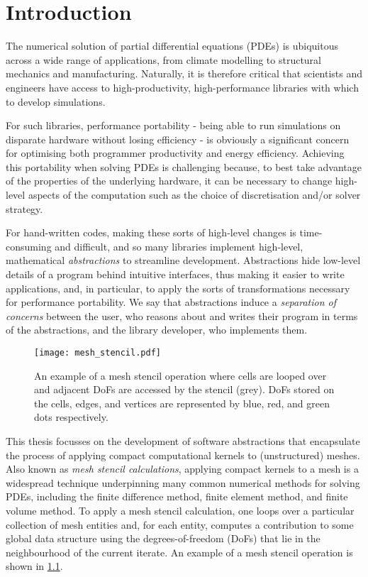 \documentclass[thesis]{subfiles}
\begin{document}
\chapter{Introduction}
\label{chapter:introduction}

The numerical solution of partial differential equations (PDEs) is ubiquitous across a wide range of applications, from climate modelling to structural mechanics and manufacturing.
Naturally, it is therefore critical that scientists and engineers have access to high-productivity, high-performance libraries with which to develop simulations.

For such libraries, performance portability - being able to run simulations on disparate hardware without losing efficiency - is obviously a significant concern for optimising both programmer productivity and energy efficiency.
Achieving this portability when solving PDEs is challenging because, to best take advantage of the properties of the underlying hardware, it can be necessary to change high-level aspects of the computation such as the choice of discretisation and/or solver strategy.

For hand-written codes, making these sorts of high-level changes is time-consuming and difficult, and so many libraries implement high-level, mathematical \emph{abstractions} to streamline development.
Abstractions hide low-level details of a program behind intuitive interfaces, thus making it easier to write applications, and, in particular, to apply the sorts of transformations necessary for performance portability.
We say that abstractions induce a \emph{separation of concerns} between the user, who reasons about and writes their program in terms of the abstractions, and the library developer, who implements them.

\begin{figure}
  \centering
  \texttt{[image: mesh\_stencil.pdf]}
  \caption{
    An example of a mesh stencil operation where cells are looped over and adjacent DoFs are accessed by the stencil (grey).
    DoFs stored on the cells, edges, and vertices are represented by blue, red, and green dots respectively.
  }
  \label{fig:mesh_stencil}
\end{figure}

This thesis focusses on the development of software abstractions that encapsulate the process of applying compact computational kernels to (unstructured) meshes.
Also known as \emph{mesh stencil calculations}, applying compact kernels to a mesh is a widespread technique underpinning many common numerical methods for solving PDEs, including the finite difference method, finite element method, and finite volume method.
To apply a mesh stencil calculation, one loops over a particular collection of mesh entities and, for each entity, computes a contribution to some global data structure using the degrees-of-freedom (DoFs) that lie in the neighbourhood of the current iterate.
An example of a mesh stencil operation is shown in \cref{fig:mesh_stencil}.
\end{document}

